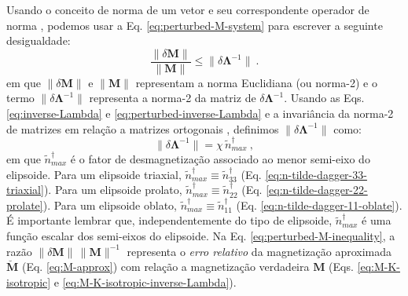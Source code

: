 Usando o conceito de norma de um vetor e seu correspondente operador de norma \citep{demmel1997, golub2013}, podemos usar a Eq.
\ref{eq:perturbed-M-system} para escrever a seguinte desigualdade:
\begin{equation}
\frac{\| \delta \mathbf{M} \|}{\| \mathbf{M} \|} \leq
\| \delta \mathbf{\Lambda}^{-1} \| \: .
\label{eq:perturbed-M-inequality}
\end{equation}
em que $\| \delta \mathbf{M} \|$ e $\| \mathbf{M} \|$
representam a norma Euclidiana (ou norma-2) e o termo 
$\| \delta \mathbf{\Lambda}^{-1} \|$ representa a norma-2 da matriz
de $\delta \mathbf{\Lambda}^{-1}$.
Usando as Eqs. \ref{eq:inverse-Lambda} e \ref{eq:perturbed-inverse-Lambda}
e a invariância da norma-2 de matrizes em relação a matrizes ortogonais
\citep{demmel1997, golub2013}, definimos
$\| \delta \mathbf{\Lambda}^{-1} \|$ como:
\begin{equation}
\| \delta \mathbf{\Lambda}^{-1} \| = \chi \,
\tilde{n}^{\dagger}_{max} \: ,
\label{eq:norm-perturbed-inverse-Lambda}
\end{equation}
em que $\tilde{n}^{\dagger}_{max}$ é o fator de desmagnetização
associado ao menor semi-eixo do elipsoide.
Para um elipsoide triaxial, 
$\tilde{n}^{\dagger}_{max} \equiv \tilde{n}^{\dagger}_{33}$
(Eq. \ref{eq:n-tilde-dagger-33-triaxial}). Para um elipsoide prolato,
$\tilde{n}^{\dagger}_{max} \equiv \tilde{n}^{\dagger}_{22}$
(Eq. \ref{eq:n-tilde-dagger-22-prolate}). 
Para um elipsoide oblato,
$\tilde{n}^{\dagger}_{max} \equiv \tilde{n}^{\dagger}_{11}$
(Eq. \ref{eq:n-tilde-dagger-11-oblate}).
É importante lembrar que, independentemente do tipo de elipsoide, $\tilde{n}^{\dagger}_{max}$ é
uma função escalar dos semi-eixos do elipsoide.
Na Eq. \ref{eq:perturbed-M-inequality}, a razão
$\| \delta \mathbf{M} \| \, \| \mathbf{M} \|^{-1}$ representa o
\textit{erro relativo} da magnetização aproximada
$\breve{\mathbf{M}}$ (Eq. \ref{eq:M-approx}) com relação a magnetização verdadeira
$\mathbf{M}$ (Eqs. \ref{eq:M-K-isotropic}
e \ref{eq:M-K-isotropic-inverse-Lambda}).

